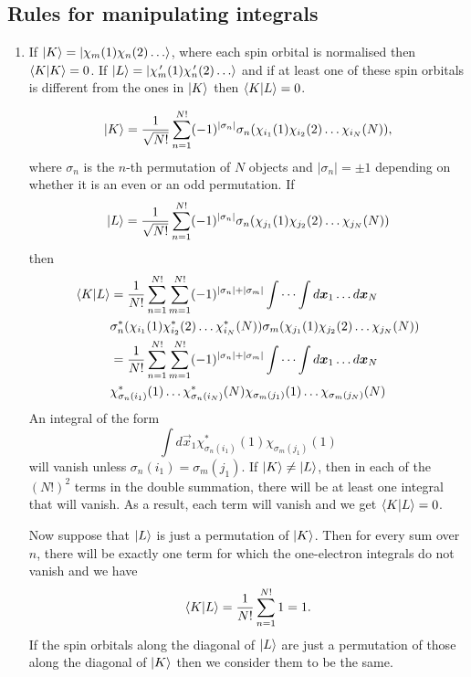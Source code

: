 \subsection{Rules for manipulating integrals}
\begin{enumerate}
\item\label{c2r1} If $\ket{K} = \ket{\chi_m(1)\chi_n(2)\ldots}$, where each spin orbital is
normalised then $\braket{K|K} = 0$. If $\ket{L} = \ket{\chi_m^{\,\prime}(1)\chi_n^{\,\prime}(2)
\ldots}$ and if at least one of these spin orbitals is different from the ones 
in $\ket{K}$ then $\braket{K|L} = 0$.

\begin{equation}\label{c2e93}
\ket{K} = \frac{1}{\sqrt{N!}}\sum_{n=1}^{N!}(-1)^{|\sigma_n|}
\sigma_n(\chi_{i_1}(1)\chi_{i_2}(2)\ldots\chi_{i_N}(N)),
\end{equation}
where $\sigma_n$ is the $n$-th permutation of $N$ objects and $|\sigma_n| = \pm
1$ depending on whether it is an even or an odd permutation.
If
\[
\ket{L} = \frac{1}{\sqrt{N!}}\sum_{n=1}^{N!}(-1)^{|\sigma_n|}
\sigma_n(\chi_{j_1}(1)\chi_{j_2}(2)\ldots\chi_{j_N}(N))
\]
then
\[
\begin{aligned}
\braket{K|L} &= \frac{1}{N!}\sum_{n=1}^{N!}\sum_{m=1}^{N!}
(-1)^{|\sigma_n|+|\sigma_m|} \int\cdots\int d\bm{x}_1\ldots d\bm{x}_N \\
 & \sigma_n^\ast(\chi_{i_1}(1)\chi_{i_2}^\ast(2)\ldots\chi_{i_N}^\ast(N))
\sigma_m(\chi_{j_1}(1)\chi_{j_2}(2)\ldots\chi_{j_N}(N)) \\
 &= \frac{1}{N!}\sum_{n=1}^{N!}\sum_{m=1}^{N!}(-1)^{|\sigma_n|+|\sigma_m|}
\int\cdots\int d\bm{x}_1\ldots d\bm{x}_N \\
 & \chi_{\sigma_n(i_1)}^\ast(1)\ldots\chi_{\sigma_n(i_N)}^\ast(N)
   \chi_{\sigma_m(j_1)}(1)\ldots\chi_{\sigma_m(j_N)}(N)
\end{aligned}
\]
An integral of the form
\[
\int d\vec{x}_1\chi_{\sigma_n(i_1)}^\ast(1)\chi_{\sigma_m(j_1)}(1)
\]
will vanish unless $\sigma_n(i_1) = \sigma_m(j_1)$. If $\ket{K} \ne \ket{L}$, 
then in each of the $(N!)^2$ terms in the double summation, there will be at
least one integral that will vanish. As a result, each term will vanish and
we get $\braket{K|L} = 0$.

Now suppose that $\ket{L}$ is just a permutation of $\ket{K}$. Then for every
sum over $n$, there will be exactly one term for which the one-electron integrals
do not vanish and we have
\[
\braket{K|L} = \frac{1}{N!}\sum_{n=1}^{N!}1 = 1.
\]
If the spin orbitals along the diagonal of $\ket{L}$ are just a permutation of
those along the diagonal of $\ket{K}$ then we consider them to be the same.


\end{enumerate}
